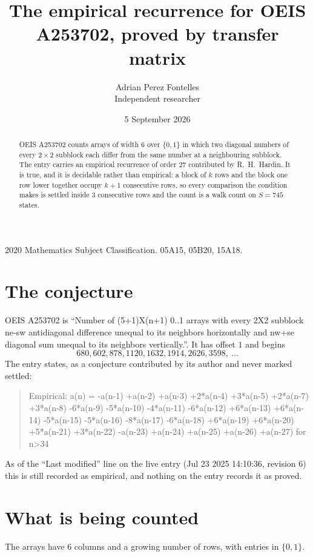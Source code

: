 \documentclass[11pt,a4paper]{article}
\title{The empirical recurrence for OEIS A253702, proved by transfer matrix}
\author{Adrian Perez Fontelles\\ \small Independent researcher}
\date{5 September 2026}
\theoremstyle{plain}
\theoremstyle{definition}
\begin{document}
\maketitle

\begin{abstract}
OEIS A253702 counts arrays of width $6$ over $\{0,1\}$ in which two diagonal numbers of every $2\times2$ subblock each differ from the same number at a neighbouring subblock. The entry carries an
empirical recurrence of order $27$ contributed by R.~H.~Hardin. It is true, and it is
decidable rather than empirical: a block of $k$ rows and the block one row lower together
occupy $k+1$ consecutive rows, so every comparison the condition makes is settled inside
$3$ consecutive rows and the count is a walk count on $S=745$ states.
\end{abstract}

\noindent\small 2020 Mathematics Subject Classification. 05A15, 05B20, 15A18.\normalsize

\section{The conjecture}

OEIS A253702 is ``Number of (5+1)X(n+1) 0..1 arrays with every 2X2 subblock ne-sw antidiagonal difference unequal to its neighbors horizontally and nw+se diagonal sum unequal to its neighbors vertically.''. It has offset $1$ and begins
\[
680, 602, 878, 1120, 1632, 1914, 2626, 3598,\ \dots
\]
The entry states, as a conjecture contributed by its author and never marked settled:
\begin{quote}
Empirical: a(n) = -a(n-1) +a(n-2) +a(n-3) +2*a(n-4) +3*a(n-5) +2*a(n-7) +3*a(n-8) -6*a(n-9) -5*a(n-10) -4*a(n-11) -6*a(n-12) +6*a(n-13) +6*a(n-14) -5*a(n-15) -5*a(n-16) -8*a(n-17) -6*a(n-18) +6*a(n-19) +6*a(n-20) +5*a(n-21) +3*a(n-22) -a(n-23) +a(n-24) +a(n-25) +a(n-26) +a(n-27) for n>34
\end{quote}
As of the ``Last modified'' line on the live entry (Jul 23 2025 14:10:36, revision 6) this is still
recorded as empirical, and nothing on the entry records it as proved.

\section{What is being counted}

The arrays have $6$ columns and a growing number of rows, with entries in $\{0,1\}$.
\end{document}
